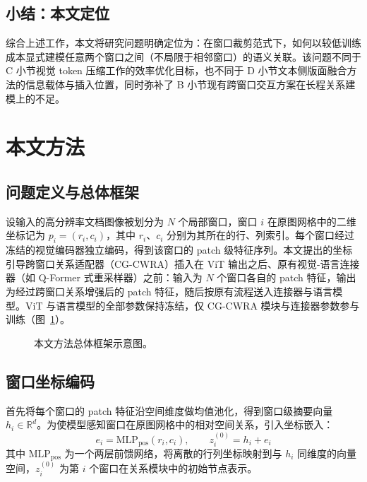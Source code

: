 \documentclass[journal]{IEEEtran}
\begin{document}
\subsection{小结：本文定位}
综合上述工作，本文将研究问题明确定位为：在窗口裁剪范式下，如何以较低训练成本显式建模任意两个窗口之间（不局限于相邻窗口）的语义关联。该问题不同于 C 小节视觉 token 压缩工作的效率优化目标，也不同于 D 小节文本侧版面融合方法的信息载体与插入位置，同时弥补了 B 小节现有跨窗口交互方案在长程关系建模上的不足。

\section{本文方法}

\subsection{问题定义与总体框架}
设输入的高分辨率文档图像被划分为 $N$ 个局部窗口，窗口 $i$ 在原图网格中的二维坐标记为 $p_i=(r_i,c_i)$，其中 $r_i$、$c_i$ 分别为其所在的行、列索引。每个窗口经过冻结的视觉编码器独立编码，得到该窗口的 patch 级特征序列。本文提出的坐标引导跨窗口关系适配器（CG-CWRA）插入在 ViT 输出之后、原有视觉-语言连接器（如 Q-Former 式重采样器）之前：输入为 $N$ 个窗口各自的 patch 特征，输出为经过跨窗口关系增强后的 patch 特征，随后按原有流程送入连接器与语言模型。ViT 与语言模型的全部参数保持冻结，仅 CG-CWRA 模块与连接器参数参与训练（图~\ref{fig:framework}）。

\begin{figure}[!t]
\centering
\caption{本文方法总体框架示意图。}
\label{fig:framework}
\end{figure}

\subsection{窗口坐标编码}
首先将每个窗口的 patch 特征沿空间维度做均值池化，得到窗口级摘要向量 $h_i \in \mathbb{R}^d$。为使模型感知窗口在原图网格中的相对空间关系，引入坐标嵌入：
\begin{equation}
e_i = \mathrm{MLP}_{\mathrm{pos}}(r_i, c_i), \qquad z_i^{(0)} = h_i + e_i
\label{eq:posenc}
\end{equation}
其中 $\mathrm{MLP}_{\mathrm{pos}}$ 为一个两层前馈网络，将离散的行列坐标映射到与 $h_i$ 同维度的向量空间，$z_i^{(0)}$ 为第 $i$ 个窗口在关系模块中的初始节点表示。
\end{document}
